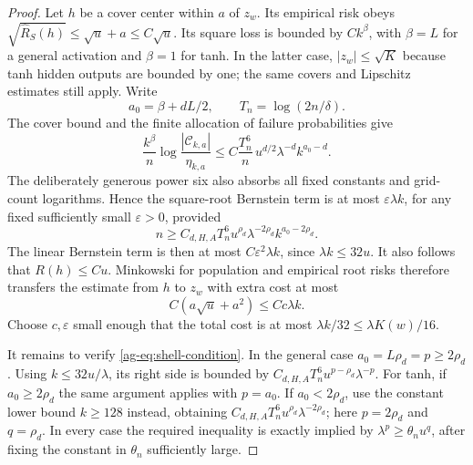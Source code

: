 \begin{proof}
Let $h$ be a cover center within $a$ of $z_w$. Its empirical risk obeys
$\sqrt{\widehat R_S(h)}\le\sqrt u+a\le C\sqrt u$.
Its square loss is bounded by $C k^\beta$, with $\beta=L$ for a general activation and $\beta=1$ for tanh. In the latter case, $|z_w|\le\sqrt K$ because tanh hidden outputs are bounded by one; the same covers and Lipschitz estimates still apply. Write
\[
 a_0=\beta+dL/2,
 \qquad T_n=\log(2n/\delta).
\]
The cover bound and the finite allocation of failure probabilities give
\[
 \frac{k^\beta}{n}\log\frac{|\mathcal C_{k,a}|}{\eta_{k,a}}
 \le C\frac{T_n^6}{n}\,
        u^{d/2}\lambda^{-d}k^{a_0-d}.
\]
The deliberately generous power six also absorbs all fixed constants and grid-count logarithms. Hence the square-root Bernstein term is at most $\varepsilon\lambda k$, for any fixed sufficiently small $\varepsilon>0$, provided
\begin{equation}
 n\ge C_{d,H,A}T_n^6
      u^{\rho_d}\lambda^{-2\rho_d}k^{a_0-2\rho_d}.
 \label{ag-eq:shell-condition}
\end{equation}
The linear Bernstein term is then at most $C\varepsilon^2\lambda k$, since $\lambda k\le32u$. It also follows that $R(h)\le C u$. Minkowski for population and empirical root risks therefore transfers the estimate from $h$ to $z_w$ with extra cost at most
\[
 C(a\sqrt u+a^2)\le Cc\lambda k.
\]
Choose $c,\varepsilon$ small enough that the total cost is at most $\lambda k/32\le\lambda K(w)/16$.

It remains to verify \eqref{ag-eq:shell-condition}. In the general case $a_0=L\rho_d=p\ge2\rho_d$. Using $k\le32u/\lambda$, its right side is bounded by
$C_{d,H,A}T_n^6 u^{p-\rho_d}\lambda^{-p}$.
For tanh, if $a_0\ge2\rho_d$ the same argument applies with $p=a_0$. If $a_0<2\rho_d$, use the constant lower bound $k\ge128$ instead, obtaining $C_{d,H,A}T_n^6u^{\rho_d}\lambda^{-2\rho_d}$; here $p=2\rho_d$ and $q=\rho_d$. In every case the required inequality is exactly implied by $\lambda^p\ge\theta_nu^q$, after fixing the constant in $\theta_n$ sufficiently large.
\end{proof}

